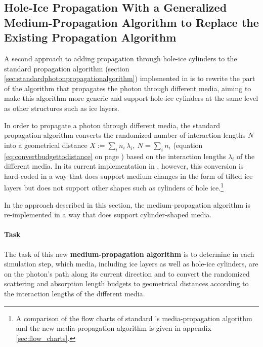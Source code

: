 
\subsection{Hole-Ice Propagation With a Generalized Medium-Propagation Algorithm to Replace the Existing Propagation Algorithm}
\label{sec:algorithm_b}


A second approach to adding propagation through hole-ice cylinders to the standard propagation algorithm (section \ref{sec:standardphotonpropagationalgorithm}) implemented in \clsim is to rewrite the part of the algorithm that propagates the photon through different media, aiming to make this algorithm more generic and support hole-ice cylinders at the same level as other structures such as ice layers.


In order to propagate a photon through different media, the standard propagation algorithm converts the randomized number of interaction lengths $N$ into a geometrical distance $X:=\sum_i n_i\,\lambda_i,\ N = \sum_i n_i$ (equation \ref{eq:convertbudgettodistance} on page \pageref{eq:convertbudgettodistance}) based on the interaction lengths $\lambda_i$ of the different media. In its current implementation in \clsim, however, this conversion is hard-coded in a way that does support medium changes in the form of tilted ice layers but does not support other shapes such as cylinders of hole ice.\footnote{A comparison of the flow charts of standard \clsim's media-propagation algorithm and the new media-propagation algorithm is given in appendix \ref{sec:flow_charts}.}

In the approach described in this section, the medium-propagation algorithm is re-implemented in a way that does support cylinder-shaped media.

\paragraph{Task}
The task of this new \textbf{medium-propagation algorithm} is to determine in each simulation step, which media, including ice layers as well as hole-ice cylinders, are on the photon's path along its current direction and to convert the randomized scattering and absorption length budgets to geometrical distances according to the interaction lengths of the different media.

